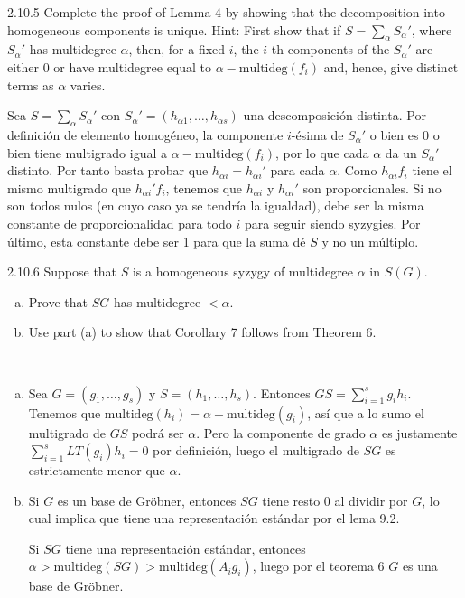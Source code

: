 \documentclass[twoside]{article}
\begin{document}
\begin{ejercicio}{2.10.5}
Complete the proof of Lemma 4 by showing that the decomposition into homogeneous
components is unique. Hint: First show that if $S =
\sum_{α} S_{α}'$, where $S_{α}'$ has multidegree
$α$, then, for a fixed $i$, the $i$-th components of the $S_{α}'$ are either 0 or have multidegree equal
to $α − \textrm{multideg}( f_i)$ and, hence, give distinct terms as $α$ varies.
\end{ejercicio}
\begin{solucion}
Sea $S=\sum_\alpha S_\alpha'$ con $S_\alpha'=(h_{\alpha 1},\dots,h_{\alpha s})$ una descomposición distinta. Por definición de elemento homogéneo, la componente $i$-ésima de $S_\alpha'$ o bien es 0 o bien tiene multigrado igual a $α − \textrm{multideg}( f_i)$, por lo que cada $\alpha$ da un $S_\alpha'$ distinto. Por tanto basta probar que $h_{\alpha i}=h_{\alpha i}'$ para cada $\alpha$. Como $h_{\alpha i}f_i$ tiene el mismo multigrado que $h_{\alpha i}'f_i$, tenemos que  $h_{\alpha i}$ y $h_{\alpha i}'$ son proporcionales. Si no son todos nulos (en cuyo caso ya se tendría la igualdad), debe ser la misma constante de proporcionalidad para todo $i$ para seguir siendo syzygies. Por último, esta constante debe ser 1 para que la suma dé $S$ y no un múltiplo. 
\end{solucion}

\newpage

\begin{ejercicio}{2.10.6}
Suppose that $S$ is a homogeneous syzygy of multidegree $α$ in $S(G)$.
\begin{enumerate}[a.]
\item Prove that $S  G$ has multidegree $< α$.
\item Use part (a) to show that Corollary 7 follows from Theorem 6.
\end{enumerate}
\end{ejercicio}
\begin{solucion}\
\begin{enumerate}[a.]
\item Sea $G=(g_1,\dots, g_s)$ y $S=(h_1,\dots, h_s)$. Entonces $GS=\sum_{i=1}^s g_ih_i$. Tenemos que $\mathrm{multideg}(h_i)=\alpha-\mathrm{multideg}(g_i)$, así que a lo sumo el multigrado de $GS$ podrá ser $\alpha$. Pero la componente de grado $\alpha$ es justamente $\sum_{i=1}^s LT(g_i)h_i=0$ por definición, luego el multigrado de $SG$ es estrictamente menor que $\alpha$. 

\item Si $G$ es un base de Gröbner, entonces $SG$ tiene resto 0 al dividir por $G$, lo cual implica que tiene una representación estándar por el lema 9.2.

Si $SG$ tiene una representación estándar, entonces $\alpha>\mathrm{multideg}(SG)>\mathrm{multideg}(A_ig_i)$, luego por el teorema 6 $G$ es una base de Gröbner. 
\end{enumerate}
\end{solucion}
\end{document}
